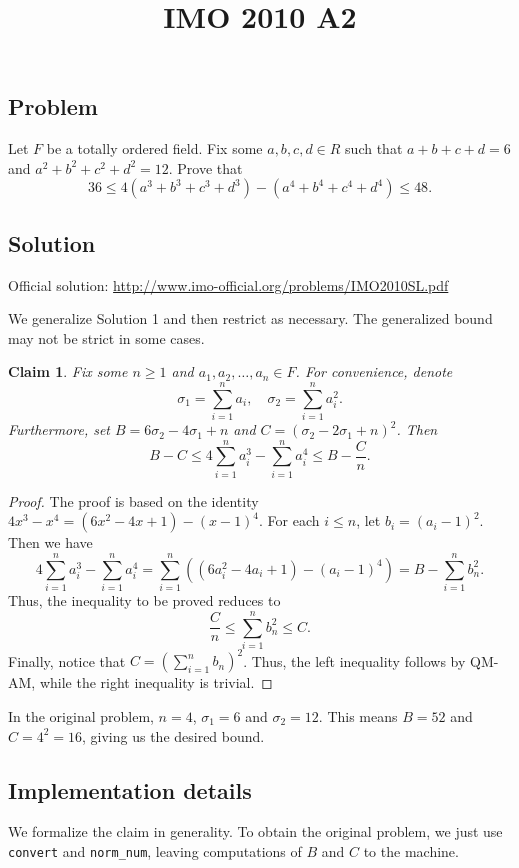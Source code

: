 \documentclass{article}
\title{IMO 2010 A2}
\author{}
\date{}
\newtheorem*{claim}{Claim}
\begin{document}
\maketitle



\subsection*{Problem}

Let $F$ be a totally ordered field.
Fix some $a, b, c, d \in R$ such that $a + b + c + d = 6$ and $a^2 + b^2 + c^2 + d^2 = 12$.
Prove that
\[ 36 \leq 4(a^3 + b^3 + c^3 + d^3) - (a^4 + b^4 + c^4 + d^4) \leq 48. \]



\subsection*{Solution}

Official solution: \url{http://www.imo-official.org/problems/IMO2010SL.pdf}

We generalize Solution 1 and then restrict as necessary.
The generalized bound may not be strict in some cases.

\begin{claim}
Fix some $n \geq 1$ and $a_1, a_2, \ldots, a_n \in F$.
For convenience, denote
\[ \sigma_1 = \displaystyle \sum_{i = 1}^n a_i, \quad \sigma_2 = \displaystyle \sum_{i = 1}^n a_i^2. \]
Furthermore, set $B = 6 \sigma_2 - 4 \sigma_1 + n$ and $C = (\sigma_2 - 2 \sigma_1 + n)^2$.
Then
\[ B - C \leq 4 \sum_{i = 1}^n a_i^3 - \sum_{i = 1}^n a_i^4 \leq B - \frac{C}{n}. \]
\end{claim}
\begin{proof}
The proof is based on the identity $4x^3 - x^4 = (6x^2 - 4x + 1) - (x - 1)^4$.
For each $i \leq n$, let $b_i = (a_i - 1)^2$.
Then we have
\[ 4 \sum_{i = 1}^n a_i^3 - \sum_{i = 1}^n a_i^4 = \sum_{i = 1}^n ((6 a_i^2 - 4 a_i + 1) - (a_i - 1)^4) = B - \sum_{i = 1}^n b_n^2. \]
Thus, the inequality to be proved reduces to
\[ \frac{C}{n} \leq \sum_{i = 1}^n b_n^2 \leq C. \]
Finally, notice that $C = \displaystyle \left(\sum_{i = 1}^n b_n\right)^2$.
Thus, the left inequality follows by QM-AM, while the right inequality is trivial.
\end{proof}

In the original problem, $n = 4$, $\sigma_1 = 6$ and $\sigma_2 = 12$.
This means $B = 52$ and $C = 4^2 = 16$, giving us the desired bound.



\subsection*{Implementation details}

We formalize the claim in generality.
To obtain the original problem, we just use \texttt{convert} and \texttt{norm\_num}, leaving computations of $B$ and $C$ to the machine.
\end{document}

